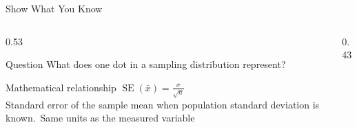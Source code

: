 \documentclass[aspectratio=169]{beamer}
\begin{document}
\begin{frame}{Show What You Know}
\begin{columns}[T]
\begin{column}{0.53\textwidth}
\begin{block}{Question}
\small What does one dot in a sampling distribution represent?
\end{block}

\begin{block}{Mathematical relationship}
\centering\Large $\operatorname{SE}(\bar{x})=\frac{\sigma}{\sqrt{n}}$\\[0.12cm]
\small Standard error of the sample mean when population standard deviation is known.\ Same units as the measured variable
\end{block}
\end{column}
\begin{column}{0.43\textwidth}
\begin{center}\end{center}
\end{column}
\end{columns}

\end{frame}
\end{document}

